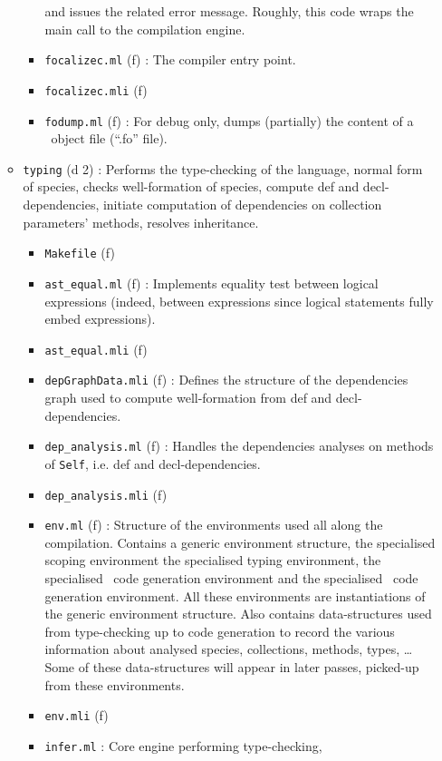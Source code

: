 \begin{itemize}
\begin{itemize}
\begin{itemize}
      and issues the related error message. Roughly, this code wraps
      the main call to the compilation engine.
    \item {\tt focalizec.ml} (f) : The compiler entry point.
    \item {\tt focalizec.mli} (f)
    \item {\tt fodump.ml} (f) : For debug only, dumps (partially) the
      content of a \focalize\ object file (``.fo'' file).
    \end{itemize}
  \item {\tt typing} (d 2) : Performs the type-checking of the
    language, normal form of species, checks well-formation of
    species, compute def and decl-dependencies, initiate computation
    of dependencies on collection parameters' methods, resolves
    inheritance.
    \begin{itemize}
    \item {\tt Makefile} (f)
    \item {\tt ast\_equal.ml} (f) : Implements equality test between
      logical expressions (indeed, between expressions since logical
      statements fully embed expressions).
    \item {\tt ast\_equal.mli} (f)
    \item {\tt depGraphData.mli} (f) : Defines the structure of the
      dependencies graph used to compute well-formation from def and
      decl-dependencies.
    \item {\tt dep\_analysis.ml} (f) : Handles the dependencies
      analyses on methods of {\tt Self}, i.e. def and decl-dependencies.
    \item {\tt dep\_analysis.mli} (f)
    \item {\tt env.ml} (f) : Structure of the environments used all
      along the compilation. Contains a generic environment
      structure, the specialised scoping environment the specialised
      typing environment, the specialised \ocaml\ code generation
      environment and the specialised \coq\ code generation
      environment. All these environments are instantiations of the
      generic environment structure. Also contains data-structures
      used from type-checking up to code generation to record the
      various information about analysed species, collections,
      methods, types, \ldots Some of these data-structures will appear
      in later passes, picked-up from these environments.
    \item {\tt env.mli} (f)
    \item {\tt infer.ml} : Core engine performing type-checking,

\end{itemize}
\end{itemize}
\end{itemize}
